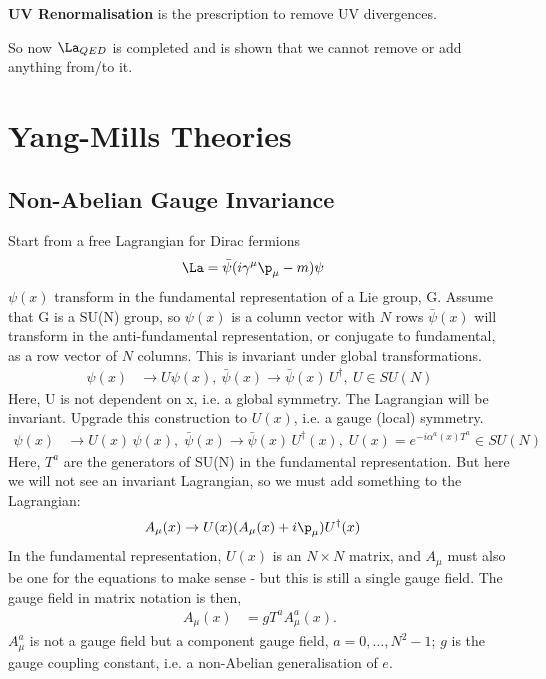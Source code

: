 \documentclass[a4paper, 11pt, normalem]{report}
\begin{document}
\textbf{UV Renormalisation} is the prescription to remove UV divergences.

So now $\La_{QED}$ is completed and is shown that we cannot remove or add anything from/to it.

\chapter{Yang-Mills Theories}
\section{Non-Abelian Gauge Invariance}
Start from a free Lagrangian for Dirac fermions
\begin{align}
    \La &= \bar{\psi}(i\gamma^\mu\p_\mu - m)\psi
\end{align}
$\psi(x)$ transform in the fundamental representation of a Lie group, G.
Assume that G is a SU(N) group, so $\psi(x)$ is a column vector with $N$ rows
$\bar{\psi}(x)$ will transform in the anti-fundamental representation, or conjugate to fundamental, as a row vector of $N$ columns.
This is invariant under global transformations.
\begin{align}
    \psi(x) &\to U\psi(x),~ \bar{\psi}(x) \to \bar{\psi}(x)\,U^\dagger,~ U \in SU(N)
\end{align}
Here, U is not dependent on x, i.e. a global symmetry.
The Lagrangian will be invariant.
Upgrade this construction to $U(x)$, i.e. a gauge (local) symmetry.
\begin{align}
    \psi(x)&\to U(x)\,\psi(x),\; \bar{\psi}(x) \to \bar{\psi}(x)\,U^\dagger(x),\; U(x) = e^{-i\alpha^a(x)T^a} \in SU(N)
\end{align}
Here, $T^a$ are the generators of SU(N) in the fundamental representation.
But here we will not see an invariant Lagrangian, so we must add something to the Lagrangian:
\begin{align}
    A_\mu(x) &\to U(x)(A_\mu(x)+i\p_\mu)U^\dagger(x)
\end{align}
In the fundamental representation, $U(x)$ is an $N\times N$ matrix, and $A_\mu$ must also be one for the equations to make sense - but this is still a single gauge field.
The gauge field in matrix notation is then,
\begin{align}
    A_\mu(x) &= gT^aA_\mu^a(x).
\end{align}
$A_\mu^a$ is not a gauge field but a component gauge field, $a=0,\dots,N^2-1$; $g$ is the gauge coupling constant, i.e. a non-Abelian generalisation of $e$.
\end{document}
